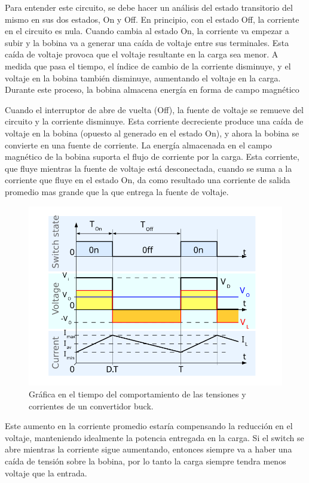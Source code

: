                 Para entender este circuito, se debe hacer un análisis del estado transitorio del mismo en sus dos estados, On y Off. En principio, con el estado Off, la corriente en el circuito es nula. Cuando cambia al estado On, la corriente va empezar a subir y la bobina va a generar una caída de voltaje entre sus terminales. Esta caída de voltaje provoca que el voltaje resultante en la carga sea menor. A medida que pasa el tiempo, el índice de cambio de la corriente disminuye, y el voltaje en la bobina también disminuye, aumentando el voltaje en la carga. Durante este proceso, la bobina almacena energía en forma de campo magnético\par
                Cuando el interruptor de abre de vuelta (Off), la fuente de voltaje se remueve del circuito y la corriente disminuye. Esta corriente decreciente produce una caída de voltaje en la bobina (opuesto al generado en el estado On), y ahora la bobina se convierte en una fuente de corriente. La energía almacenada en el campo magnético de la bobina suporta el flujo de corriente por la carga. Esta corriente, que fluye mientras la fuente de voltaje está desconectada, cuando se suma a la corriente que fluye en el estado On, da como resultado una corriente de salida promedio mas grande que la que entrega la fuente de voltaje.\par

                \begin{figure} [!ht]
                    \centering
                    \includegraphics[width=0.6\linewidth]{Imagenes/MPPT/Gráfica.jpg}
                    \caption{Gráfica en el tiempo del comportamiento de las tensiones y corrientes de un convertidor buck.}
                    \label{fig:m1.4}
                \end{figure}
                
                Este aumento en la corriente promedio estaría compensando la reducción en el voltaje, manteniendo idealmente la potencia entregada en la carga. Si el switch se abre mientras la corriente sigue aumentando, entonces siempre va a haber una caída de tensión sobre la bobina, por lo tanto la carga siempre tendra menos voltaje que la entrada.\par

